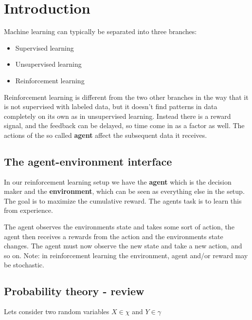 
\section{Introduction}
Machine learning can typically be separated into three branches: 

\begin{itemize}
	\item Supervised learning
	\item Unsupervised learning
	\item Reinforcement learning
\end{itemize}

Reinforcement learning is different from the two other branches in the way that it is not supervised with labeled data, but it doesn't find patterns in data completely on its own as in unsupervised learning. Instead there is a reward signal, and the feedback can be delayed, so time come in as a factor as well. The actions of the so called \textbf{agent} affect the subsequent data it receives. 

\subsection{The agent-environment interface}
In our reinforcement learning setup we have the \textbf{agent} which is the decision maker and the \textbf{environment}, which can be seen as everything else in the setup. The goal is to maximize the cumulative reward. The agents task is to learn this from experience. 

The agent observes the environments state and takes some sort of action, the agent then receives a rewards from the action and the environments state changes. The agent must now observe the new state and take a new action, and so on. Note: in reinforcement learning the environment, agent and/or reward may be stochastic.  

\subsection{Probability theory - review}
Lets consider two random variables $X \in \chi$ and $Y \in \gamma$ 

